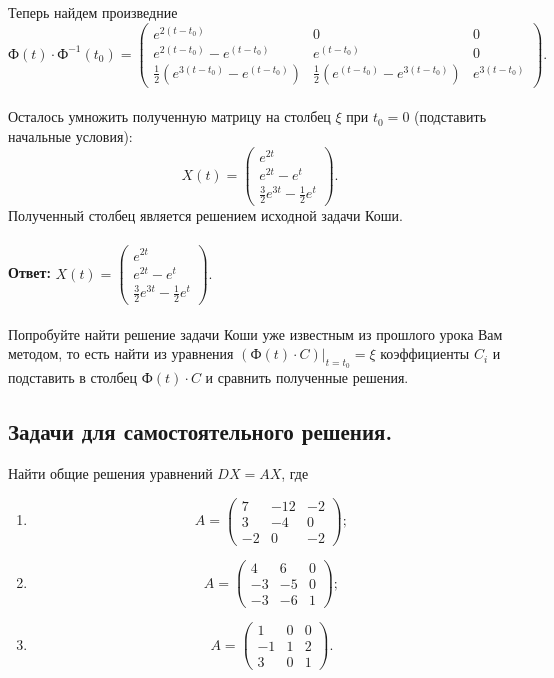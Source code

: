 \documentclass[a4paper, 12pt]{article}
\newcommand{\FI}{\text{Ф}}
\begin{document}
Теперь найдем произведние $\FI(t)\cdot \FI^{-1}(t_0)=\begin{pmatrix}
	e^{2(t-t_0)} & 0 & 0\\
	e^{2(t-t_0)}-e^{(t-t_0)} & e^{(t-t_0)} & 0\\
	\frac{1}{2}(e^{3(t-t_0)} - e^{(t-t_0)}) & \frac{1}{2}(e^{(t-t_0)} - e^{3(t-t_0)}) & e^{3(t-t_0)}
\end{pmatrix}.$ \\\\
Осталось умножить полученную матрицу на столбец $\xi$ при $t_0 = 0$ (подставить начальные условия):
$$X(t) = \begin{pmatrix}
	e^{2t}\\
	e^{2t} - e^t\\
	\frac{3}{2} e^{3t} - \frac{1}{2}e^t
\end{pmatrix}.$$
Полученный столбец является решением исходной задачи Коши.\\\\
\textbf{Ответ:} $X(t) = \begin{pmatrix}
	e^{2t}\\
	e^{2t} - e^t\\
	\frac{3}{2} e^{3t} - \frac{1}{2}e^t
\end{pmatrix}.$\\\\
Попробуйте найти решение задачи Коши уже известным из прошлого урока Вам методом, то есть найти из уравнения $(\FI(t)\cdot C)|_{t=t_0} = \xi$ коэффициенты $C_i$ и подставить в столбец $\FI(t)\cdot C$ и сравнить полученные решения.
\subsection*{Задачи для самостоятельного решения.}
Найти общие решения уравнений $DX = AX$, где
\begin{enumerate}
	\item $$A = \begin{pmatrix}
		7 & -12 & -2\\
		3 & -4 & 0\\
		-2 & 0 & -2
	\end{pmatrix};$$
\item $$A = \begin{pmatrix}
	4 & 6 & 0\\
	-3 & -5 & 0\\
	-3 & -6 & 1
\end{pmatrix};$$
\item $$A = \begin{pmatrix}
	1 & 0 & 0\\
	-1 & 1 & 2\\
	3 & 0 & 1
\end{pmatrix}.$$
\end{enumerate}
\end{document}
